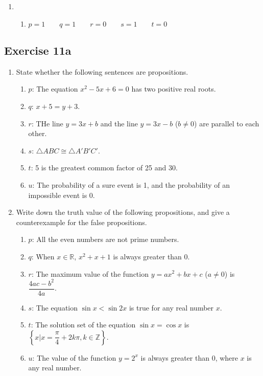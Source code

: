 \documentclass{report}
\begin{document}
\begin{enumerate}[label=\textbf{Sol.}]
    \item \begin{enumerate}[label=]
              \item $p = 1 \qquad q = 1 \qquad r = 0 \qquad s = 1 \qquad t = 0$
          \end{enumerate}
\end{enumerate}

\subsection*{Exercise 11a}
\begin{enumerate}
    \item State whether the following sentences are propositions.
          \begin{enumerate}[label=, leftmargin=*]
              \item $p$: The equation $x^2 - 5x + 6 = 0$ has two positive real roots.
              \item $q$: $x + 5 = y + 3$.
              \item $r$: THe line $y = 3x + b$ and the line $y = 3x - b$ ($b \neq 0$) are parallel to each other.
              \item $s$: $\triangle ABC \cong \triangle A'B'C'$.
              \item $t$: 5 is the greatest common factor of 25 and 30.
              \item $u$: The probability of a sure event is 1, and the probability of an impossible event is 0.
          \end{enumerate}
    \item Write down the truth value of the following propositions, and give a
          counterexample for the false propositions.
          \begin{enumerate}[label=, leftmargin=*]
              \item $p$: All the even numbers are not prime numbers.
              \item $q$: When $x \in \mathbb{R}$, $x^2 + x + 1$ is always greater than 0.
              \item $r$: The maximum value of the function $y = ax^2 + bx + c$ ($a \neq 0$) is $\dfrac{4ac - b^2}{4a}$.
              \item $s$: The equation $\sin x < \sin 2x$ is true for any real number $x$.
              \item $t$: The solution set of the equation $\sin x = \cos x$ is $\left\{x | x = \dfrac{\pi}{4} + 2k\pi, k \in \mathbb{Z}\right\}$.
              \item $u$: The value of the function $y = 2^x$ is always greater than 0, where $x$ is any real number.
          \end{enumerate}
\end{enumerate}
\end{document}
